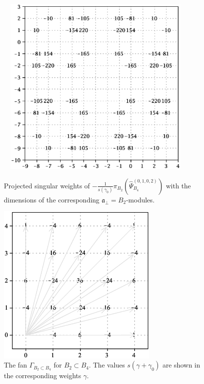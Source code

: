 \documentclass[12pt]{iopart}
\theoremstyle{definition}
\begin{document}
\begin{figure}[pt]
  \centering
    \includegraphics[width=100mm,height=90mm]{figure4.eps}
  \caption{Projected singular weights of $-\frac{1}{s(\gamma_0)}\pi_{B_2}\left(\hat \Psi^{(0,1,0,2)}_{B_4}\right)$
  with the dimensions of the corresponding $\mathfrak{a}_{\bot}=B_2$-modules.}
  \label{fig:B4B2anom}

%
  \centering
  \includegraphics[height=80mm]{figure5.eps}
  \caption{The fan $\Gamma_{B_2\subset B_4}$ for $B_2\subset B_4$. The values $s(\gamma+\gamma_0)$ are shown in the corresponding weights $\gamma$.}
  \label{fig:B4B2Fan}
\end{figure}
\end{document}
